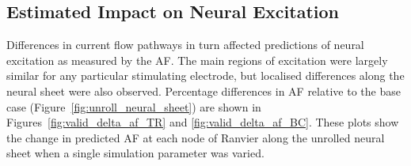 \subsection{Estimated Impact on Neural Excitation}

Differences in current flow pathways in turn affected predictions of neural
excitation as measured by the AF. The main regions of excitation were largely
similar for any particular stimulating electrode, but localised differences
along the neural sheet were also observed. Percentage differences in AF relative
to the base case (Figure~\ref{fig:unroll_neural_sheet}) are shown in
Figures~\ref{fig:valid_delta_af_TR} and \ref{fig:valid_delta_af_BC}. These plots
show the change in predicted AF at each node of Ranvier along the unrolled
neural sheet when a single simulation parameter was varied.

